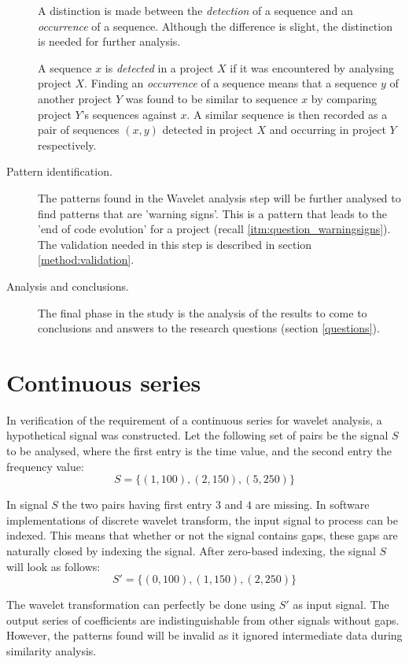 \begin{description}
	A distinction is made between the \textit{detection} of a sequence and an
	\textit{occurrence} of a sequence. Although the difference is slight, the
	distinction is needed for further analysis.

	A sequence $x$ is \textit{detected} in a project $X$ if it was encountered by
	analysing project $X$. Finding an \textit{occurrence} of a sequence means that
	a sequence $y$ of another project $Y$ was found to be similar to sequence $x$
	by comparing project $Y$'s sequences against $x$. A similar sequence is then
	recorded as a pair of sequences $(x, y)$ detected in project $X$ and occurring
	in project $Y$ respectively.
	
	\item[Pattern identification.] The patterns found in the Wavelet analysis step
	will be further analysed to find patterns that are 'warning signs'. This is a
	pattern that leads to the 'end of code evolution' for a project (recall
	\ref{itm:question_warningsigns}). The validation needed in this step is
	described in section \ref{method:validation}.
	
	\item[Analysis and conclusions.] The final phase in the study is the analysis
	of the results to come to conclusions and answers to the research questions
	(section \ref{questions}).
\end{description}

\section{Continuous series}
\label{section:gapless_wavelets}
In verification of the requirement of a continuous series for wavelet analysis,
a hypothetical signal was constructed. Let the following set of pairs be the
signal $S$ to be analysed, where the first entry is the time value, and the
second entry the frequency value:
$$S = \{(1,100), (2,150), (5,250)\}$$

\noindent
In signal $S$ the two pairs having first entry $3$ and $4$ are missing. In
software implementations of discrete wavelet transform, the input signal to
process can be indexed. This means that whether or not the signal contains
gaps, these gaps are naturally closed by indexing the signal. After zero-based
indexing, the signal $S$ will look as follows:
$$S' = \{(0,100), (1,150), (2,250)\}$$

\noindent
The wavelet transformation can perfectly be done using $S'$ as input
signal. The output series of coefficients are indistinguishable from other
signals without gaps. However, the patterns found will be invalid as it ignored
intermediate data during similarity analysis.

